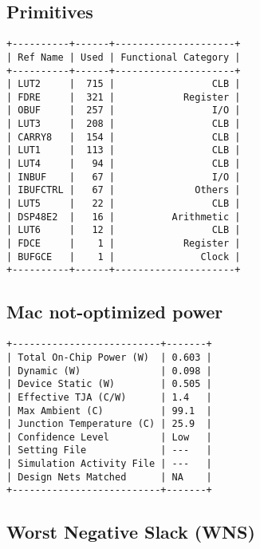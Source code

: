 \documentclass[11pt]{report}
\begin{document}
\newpage

\subsection*{Primitives}
\small
\begin{lstlisting}
+----------+------+---------------------+
| Ref Name | Used | Functional Category |
+----------+------+---------------------+
| LUT2     |  715 |                 CLB |
| FDRE     |  321 |            Register |
| OBUF     |  257 |                 I/O |
| LUT3     |  208 |                 CLB |
| CARRY8   |  154 |                 CLB |
| LUT1     |  113 |                 CLB |
| LUT4     |   94 |                 CLB |
| INBUF    |   67 |                 I/O |
| IBUFCTRL |   67 |              Others |
| LUT5     |   22 |                 CLB |
| DSP48E2  |   16 |          Arithmetic |
| LUT6     |   12 |                 CLB |
| FDCE     |    1 |            Register |
| BUFGCE   |    1 |               Clock |
+----------+------+---------------------+
\end{lstlisting}

\newpage


\subsection*{Mac not-optimized power}
\small
\begin{lstlisting}
+--------------------------+-------+
| Total On-Chip Power (W)  | 0.603 |
| Dynamic (W)              | 0.098 |
| Device Static (W)        | 0.505 |
| Effective TJA (C/W)      | 1.4   |
| Max Ambient (C)          | 99.1  |
| Junction Temperature (C) | 25.9  |
| Confidence Level         | Low   |
| Setting File             | ---   |
| Simulation Activity File | ---   |
| Design Nets Matched      | NA    |
+--------------------------+-------+
\end{lstlisting}


\subsection*{Worst Negative Slack (WNS)}
\end{document}
